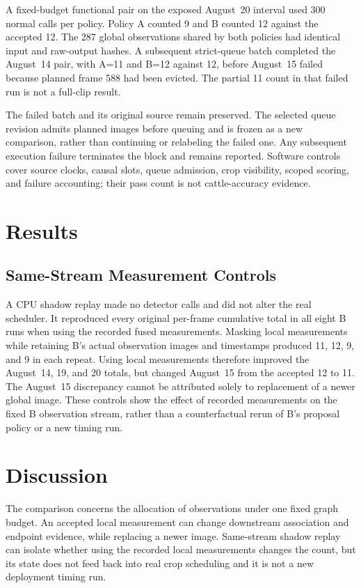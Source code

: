 \documentclass[journal]{IEEEtran}
\begin{document}
A fixed-budget functional pair on the exposed August~20 interval used 300 normal calls per policy. Policy A counted 9 and B counted 12 against the accepted 12. The 287 global observations shared by both policies had identical input and raw-output hashes. A subsequent strict-queue batch completed the August~14 pair, with A=11 and B=12 against 12, before August~15 failed because planned frame 588 had been evicted. The partial 11 count in that failed run is not a full-clip result.

The failed batch and its original source remain preserved. The selected queue revision admits planned images before queuing and is frozen as a new comparison, rather than continuing or relabeling the failed one. Any subsequent execution failure terminates the block and remains reported. Software controls cover source clocks, causal slots, queue admission, crop visibility, scoped scoring, and failure accounting; their pass count is not cattle-accuracy evidence.

\section{Results}



\subsection{Same-Stream Measurement Controls}
A CPU shadow replay made no detector calls and did not alter the real scheduler. It reproduced every original per-frame cumulative total in all eight B runs when using the recorded fused measurements. Masking local measurements while retaining B's actual observation images and timestamps produced 11, 12, 9, and 9 in each repeat. Using local measurements therefore improved the August~14, 19, and 20 totals, but changed August~15 from the accepted 12 to 11. The August~15 discrepancy cannot be attributed solely to replacement of a newer global image. These controls show the effect of recorded measurements on the fixed B observation stream, rather than a counterfactual rerun of B's proposal policy or a new timing run.




\section{Discussion}
The comparison concerns the allocation of observations under one fixed graph budget. An accepted local measurement can change downstream association and endpoint evidence, while replacing a newer image. Same-stream shadow replay can isolate whether using the recorded local measurements changes the count, but its state does not feed back into real crop scheduling and it is not a new deployment timing run.
\end{document}
